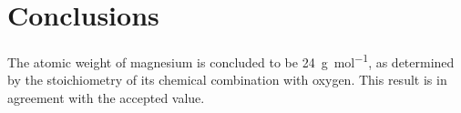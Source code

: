 \documentclass{article}
\begin{document}
\section{Conclusions}

The atomic weight of magnesium is concluded to be \SI{24}{\gram\per\mol}, as determined by the stoichiometry of its chemical combination with oxygen. This result is in agreement with the accepted value.






\end{document}
